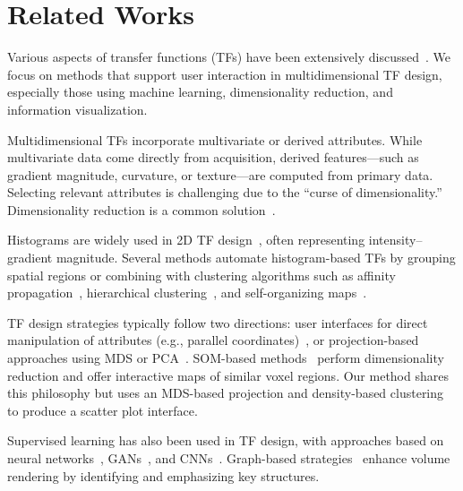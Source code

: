 \section{Related Works}
\label{sect:related-works}

Various aspects of transfer functions (TFs) have been extensively discussed~\cite{ljung2016}. We focus on methods that support user interaction in multidimensional TF design, especially those using machine learning, dimensionality reduction, and information visualization.

Multidimensional TFs incorporate multivariate or derived attributes. While multivariate data come directly from acquisition, derived features—such as gradient magnitude, curvature, or texture—are computed from primary data. Selecting relevant attributes is challenging due to the “curse of dimensionality.” Dimensionality reduction is a common solution~\cite{cai2017, abbasloo2016, gao2022, moura2007, zhao2010}.

Histograms are widely used in 2D TF design~\cite{kniss2002}, often representing intensity–gradient magnitude. Several methods automate histogram-based TFs by grouping spatial regions or combining with clustering algorithms such as affinity propagation~\cite{zhang2016}, hierarchical clustering~\cite{sereda2006}, and self-organizing maps~\cite{tzeng2004}.

TF design strategies typically follow two directions: user interfaces for direct manipulation of attributes (e.g., parallel coordinates)~\cite{tory2005, zhao2010}, or projection-based approaches using MDS or PCA~\cite{guo2011}. SOM-based methods~\cite{moura2007, khan2015, cai2017} perform dimensionality reduction and offer interactive maps of similar voxel regions. Our method shares this philosophy but uses an MDS-based projection and density-based clustering to produce a scatter plot interface.

Supervised learning has also been used in TF design, with approaches based on neural networks~\cite{tzeng2005, wang2006}, GANs~\cite{berger2018, hong2019}, and CNNs~\cite{kim2021, pan2024}. Graph-based strategies~\cite{sharma2020} enhance volume rendering by identifying and emphasizing key structures.

